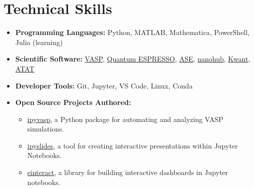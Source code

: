 \documentclass[letter,11pt]{article}
\begin{document}
\section{Technical Skills}
\begin{itemize}
    \item \textbf{Programming Languages:} Python, MATLAB, Mathematica, PowerShell, Julia (learning)
    \item \textbf{Scientific Software:} \href{https://www.vasp.at/}{VASP}, \href{https://www.quantum-espresso.org/}{Quantum ESPRESSO}, \href{https://wiki.fysik.dtu.dk/ase/}{ASE}, \href{https://nanohub.org}{nanohub}, \href{https://kwant-project.org}{Kwant}, \href{https://axelvandewalle.github.io/www-avdw/atat/}{ATAT}
    \item \textbf{Developer Tools:} Git, Jupyter, VS Code, Linux, Conda
    \item \textbf{Open Source Projects Authored:}
    \begin{itemize}
        \item \href{https://github.com/asaboor-gh/ipyvasp}{ipyvasp}, a Python package for automating and analyzing VASP simulations.
        \item \href{https://github.com/asaboor-gh/ipyslides}{ipyslides}, a tool for creating interactive presentations within Jupyter Notebooks.
        \item \href{https://github.com/asaboor-gh/einteract}{einteract}, a library for building interactive dashboards in Jupyter notebooks.
    \end{itemize}
\end{itemize}
\end{document}
